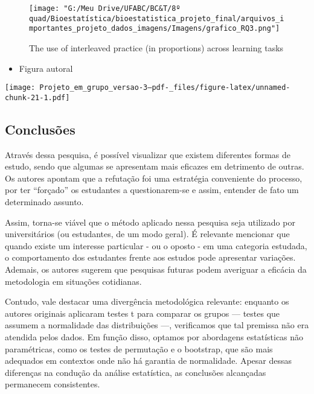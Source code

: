 \documentclass[
]{article}
\providecommand{\tightlist}{%
  \setlength{\itemsep}{0pt}\setlength{\parskip}{0pt}}
\begin{document}
\begin{figure}
\centering
\texttt{[image: "G:/Meu Drive/UFABC/BC\&T/8º quad/Bioestatística/bioestatistica\_projeto\_final/arquivos\_importantes\_projeto\_dados\_imagens/Imagens/grafico\_RQ3.png"]}
\caption{The use of interleaved practice (in proportions) across
learning tasks}
\end{figure}

\begin{itemize}
\tightlist
\item
  Figura autoral
\end{itemize}

\texttt{[image: Projeto\_em\_grupo\_versao-3--pdf-\_files/figure-latex/unnamed-chunk-21-1.pdf]}

\subsection{Conclusões}\label{conclusuxf5es}

Através dessa pesquisa, é possível visualizar que existem diferentes
formas de estudo, sendo que algumas se apresentam mais eficazes em
detrimento de outras. Os autores apontam que a refutação foi uma
estratégia conveniente do processo, por ter ``forçado'' os estudantes a
questionarem-se e assim, entender de fato um determinado assunto.

Assim, torna-se viável que o método aplicado nessa pesquisa seja
utilizado por universitários (ou estudantes, de um modo geral). É
relevante mencionar que quando existe um interesse particular - ou o
oposto - em uma categoria estudada, o comportamento dos estudantes
frente aos estudos pode apresentar variações. Ademais, os autores
sugerem que pesquisas futuras podem averiguar a eficácia da metodologia
em situações cotidianas.

Contudo, vale destacar uma divergência metodológica relevante: enquanto
os autores originais aplicaram testes t para comparar os grupos ---
testes que assumem a normalidade das distribuições ---, verificamos que
tal premissa não era atendida pelos dados. Em função disso, optamos por
abordagens estatísticas não paramétricas, como os testes de permutação e
o bootstrap, que são mais adequados em contextos onde não há garantia de
normalidade. Apesar dessas diferenças na condução da análise
estatística, as conclusões alcançadas permanecem consistentes.
\end{document}
